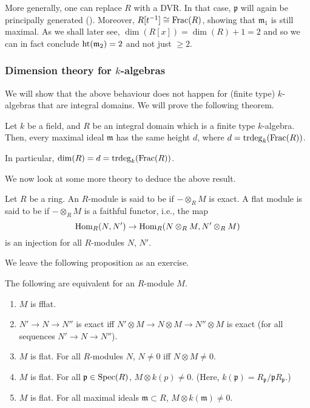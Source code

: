 \documentclass[12pt]{article}
\begin{document}
More generally, one can replace $R$ with a DVR. In that case, $\mathfrak{p}$ will again be principally generated (). Moreover, $R[t^{-1}] \cong \operatorname{Frac}(R)$, showing that $\mathfrak{m}_{1}$ is still maximal. \newline
As we shall later see, $\dim(R[x]) = \dim(R) + 1 = 2$ and so we can in fact conclude $\operatorname{ht}(\mathfrak{m}_{2}) = 2$ and not just $\ge 2$.

\subsubsection{Dimension theory for \texorpdfstring{$k$}{k}-algebras}

We will show that the above behaviour does not happen for (finite type) $k$-algebras that are integral domains. We will prove the following theorem.

\begin{thm}
	Let $k$ be a field, and $R$ be an integral domain which is a finite type $k$-algebra. \newline
	Then, every maximal ideal $\mathfrak{m}$ has the same height $d$, where $d = \operatorname{trdeg}_{k}(\operatorname{Frac}(R))$.

	In particular, $\dim(R) = d = \operatorname{trdeg}_{k}(\operatorname{Frac}(R))$.
\end{thm}

We now look at some more theory to deduce the above result.

\begin{defn}
	Let $R$ be a ring. An $R$-module is said to be  if $- \otimes_{R} M$ is exact. \newline
	A flat module is said to be  if $- \otimes_{R} M$ is a faithful functor, i.e., the map
	\begin{equation*} 
		\operatorname{Hom}_{R}(N, N') \to \operatorname{Hom}_{R}(N \otimes_{R} M, N' \otimes_{R} M)
	\end{equation*}
	is an injection for all $R$-modules $N$, $N'$.
\end{defn}

We leave the following proposition as an exercise.

\begin{prop} \label{prop:equiv-fflat}
	The following are equivalent for an $R$-module $M$.
	\begin{enumerate}
		\item $M$ is fflat.
		\item $N' \to N \to N''$ is exact iff $N' \otimes M \to N \otimes M \to N'' \otimes M$ is exact (for all sequences $N' \to N \to N''$).
		\item $M$ is flat. For all $R$-modules $N$, $N \neq 0$ iff $N \otimes M \neq 0$.
		\item $M$ is flat. For all $\mathfrak{p} \in \operatorname{Spec}(R)$, $M \otimes k(p) \neq 0$. (Here, $k(\mathfrak{p}) = R_{\mathfrak{p}}/\mathfrak{p} R_{\mathfrak{p}}$.)
		\item \label{item:fflat-5} $M$ is flat. For all maximal ideals $\mathfrak{m} \subset R$, $M \otimes k(\mathfrak{m}) \neq 0$.
	\end{enumerate}
\end{prop}
\end{document}
